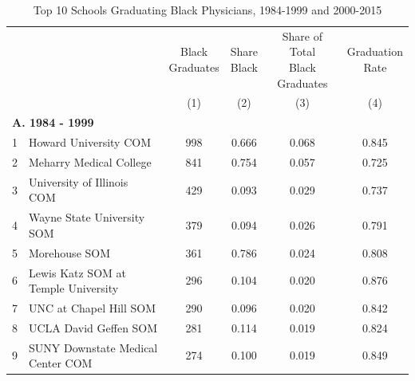 \documentclass[12pt]{article}
\begin{document}
\clearpage
\begin{landscape}
\begin{table}[]
  \centering
  \small
  \caption{Top 10 Schools Graduating Black Physicians, 1984-1999 and 2000-2015}
  \label{tab:top10}
  \begin{tabular}{clcccc}
    \hline\hline
    \multirow{2}{*}{} & \multirow{2}{*}{}     & \multirow{2}{*}{\parbox{2cm}{Black \\ Graduates}} & \multirow{2}{*}{\parbox{1.5cm}{Share \\ Black}} & \multirow{2}{*}{\parbox{3.1cm}{Share of Total  \\ Black Graduates}} & \multirow{2}{*}{\parbox{2.2cm}{Graduation \\ Rate}} \\
                        &                                          &                                  &                              &                                                   &                                  \\
                        &  & (1) & (2) & (3) & (4) \\
                        \hline
  \multicolumn{2}{l}{\textbf{A. 1984 -   1999}}                          &                                  &                              &                                                   &                                  \\
  1  & Howard University COM                    & 998  & 0.666 & 0.068 & 0.845 \\
  2  & Meharry Medical College                  & 841  & 0.754 & 0.057 & 0.725 \\
  3  & University of Illinois COM               & 429  & 0.093 & 0.029 & 0.737 \\
  4  & Wayne State University SOM               & 379  & 0.094 & 0.026 & 0.791 \\
  5  & Morehouse SOM                            & 361  & 0.786 & 0.024 & 0.808 \\
  6  & Lewis Katz SOM at Temple University      & 296  & 0.104 & 0.020 & 0.876 \\
  7  & UNC at Chapel Hill SOM                   & 290  & 0.096 & 0.020 & 0.842 \\
  8  & UCLA David Geffen SOM                    & 281  & 0.114 & 0.019 & 0.824 \\
  9  & SUNY Downstate Medical Center COM        & 274  & 0.100 & 0.019 & 0.849 \\

\end{tabular}
\end{table}
\end{landscape}
\end{document}
